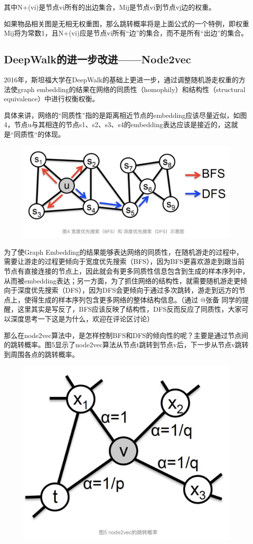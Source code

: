 \documentclass[12pt]{article}
\begin{document}
其中N+(vi)是节点vi所有的出边集合，Mij是节点vi到节点vj边的权重。

如果物品相关图是无相无权重图，那么跳转概率将是上面公式的一个特例，即权重Mij将为常数1，且N+(vi)应是节点vi所有“边”的集合，而不是所有“出边”的集合。

\subsection{DeepWalk的进一步改进——Node2vec}
2016年，斯坦福大学在DeepWalk的基础上更进一步，通过调整随机游走权重的方法使graph embedding的结果在网络的同质性（homophily）和结构性（structural equivalence）中进行权衡权衡。

具体来讲，网络的“同质性”指的是距离相近节点的embedding应该尽量近似，如图4，节点u与其相连的节点s1、s2、s3、s4的embedding表达应该是接近的，这就是“同质性“的体现。
\begin{figure}[H]
    \centering
    \includegraphics[width=.6\textwidth]{fig/Graph_Embedding_BFS_DFS.png}
\end{figure}

为了使Graph Embedding的结果能够表达网络的同质性，在随机游走的过程中，需要让游走的过程更倾向于宽度优先搜索（BFS），因为BFS更喜欢游走到跟当前节点有直接连接的节点上，因此就会有更多同质性信息包含到生成的样本序列中，从而被embedding表达；另一方面，为了抓住网络的结构性，就需要随机游走更倾向于深度优先搜索（DFS），因为DFS会更倾向于通过多次跳转，游走到远方的节点上，使得生成的样本序列包含更多网络的整体结构信息。（通过 
@张备
 同学的提醒，这里其实是写反了，BFS应该反映了结构性，DFS反而反应了同质性，大家可以深度思考一下这是为什么，欢迎在评论区讨论）

那么在node2vec算法中，是怎样控制BFS和DFS的倾向性的呢？主要是通过节点间的跳转概率。图5显示了node2vec算法从节点t跳转到节点v后，下一步从节点v跳转到周围各点的跳转概率。
\begin{figure}[H]
    \centering
    \includegraphics[width=.6\textwidth]{fig/Graph_Embedding_Node2Vec_Trans_Prob.png}
\end{figure}
\end{document}
